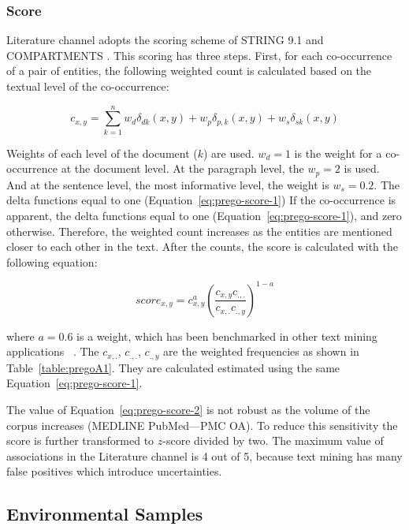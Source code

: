 \subsubsection{Score}

Literature channel adopts the scoring scheme of STRING 9.1 \parencite{franceschini2012string}
and COMPARTMENTS \parencite{binder2014compartments}. This scoring has three steps. 
First, for each co-occurrence of a pair of entities, the following weighted count is
calculated based on the textual level of the co-occurrence:

\begin{equation}
   c_{x,y} = \sum_{k=1}^{n}{w_d \delta_{dk}(x,y) +w_p \delta_{p,k}(x,y) + w_s \delta_{sk}(x,y)}
   \label{eq:prego-score-1}
\end{equation}

Weights of each level of the document ($k$) are used.
$w_d = 1$ is the weight for a co-occurrence at the document
level. 
At the paragraph level, the $w_p = 2$ is used. And at the sentence level, the most
informative level, the weight is $w_s = 0.2$.
The delta functions equal to one (Equation~\ref{eq:prego-score-1})
If the co-occurrence is apparent, the delta functions equal to one (Equation~\ref{eq:prego-score-1}),
and zero otherwise.
Therefore, the weighted count increases as the entities are mentioned 
closer to each other in the text. 
After the counts, the score is calculated with the following equation:

\begin{equation}
   score_{x,y} = c_{x,y}^a (\frac{c_{x,y} c_{.,.}}{c_{x, .}c_{.,y}})^{1-a}
   \label{eq:prego-score-2}
\end{equation}

where $a = 0.6$ is a weight, which has been benchmarked in other 
text mining applications ~\parencite{franceschini2012string, binder2014compartments, pletscher2015diseases}. 
The $c_{x,.}$, $c_{.,.}$, $c_{.,y}$ are the weighted frequencies as shown in Table~\ref{table:pregoA1}.
They are calculated estimated using the same Equation~\ref{eq:prego-score-1}. 

The value of Equation~\ref{eq:prego-score-2} is not robust as
the volume of the corpus increases (MEDLINE PubMed—PMC OA).
To reduce this sensitivity the score is further transformed to $z$-score divided by two.
The maximum value of associations in the Literature channel is 4 out of 5, because 
text mining has many false positives which introduce uncertainties.

   \subsection{Environmental Samples}
   \label{subsec:prego-envsamples}

